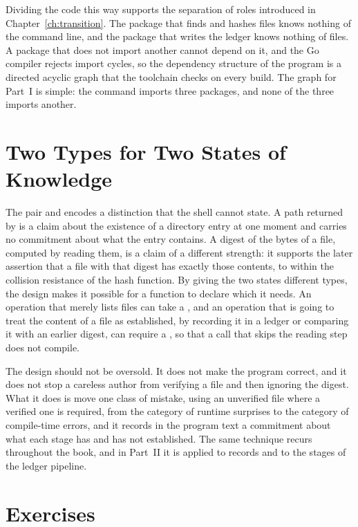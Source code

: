 Dividing the code this way supports the separation of roles introduced in Chapter~\ref{ch:transition}. The package that finds and hashes files knows nothing of the command line, and the package that writes the ledger knows nothing of files. A package that does not import another cannot depend on it, and the Go compiler rejects import cycles, so the dependency structure of the program is a directed acyclic graph that the toolchain checks on every build. The graph for Part~I is simple: the command imports three packages, and none of the three imports another.

\section{Two Types for Two States of Knowledge}
\label{sec:two-states}

The pair  and  encodes a distinction that the shell cannot state. A path returned by  is a claim about the existence of a directory entry at one moment and carries no commitment about what the entry contains. A digest of the bytes of a file, computed by reading them, is a claim of a different strength: it supports the later assertion that a file with that digest has exactly those contents, to within the collision resistance of the hash function. By giving the two states different types, the design makes it possible for a function to declare which it needs. An operation that merely lists files can take a , and an operation that is going to treat the content of a file as established, by recording it in a ledger or comparing it with an earlier digest, can require a , so that a call that skips the reading step does not compile.

The design should not be oversold. It does not make the program correct, and it does not stop a careless author from verifying a file and then ignoring the digest. What it does is move one class of mistake, using an unverified file where a verified one is required, from the category of runtime surprises to the category of compile-time errors, and it records in the program text a commitment about what each stage has and has not established. The same technique recurs throughout the book, and in Part~II it is applied to records and to the stages of the ledger pipeline.

\section*{Exercises}

